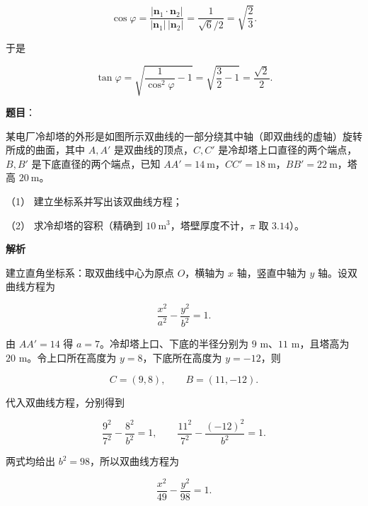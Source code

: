 \begin{answer}
\nopagebreak[4]
\[
\cos\varphi=\frac{|\boldsymbol n_1\cdot\boldsymbol n_2|}
{|\boldsymbol n_1|\,|\boldsymbol n_2|}
=\frac1{\sqrt6/2}=\sqrt{\frac23}.
\]

于是

\nopagebreak[4]
\[
\tan\varphi=\sqrt{\frac1{\cos^2\varphi}-1}
=\sqrt{\frac32-1}=\frac{\sqrt2}{2}.
\]



\end{answer}
\begin{answer}

\textbf{题目}：

某电厂冷却塔的外形是如图所示双曲线的一部分绕其中轴（即双曲线的虚轴）旋转所成的曲面，其中 $A,A'$ 是双曲线的顶点，$C,C'$ 是冷却塔上口直径的两个端点，$B,B'$ 是下底直径的两个端点，已知 $AA'=14\ \mathrm m$，$CC'=18\ \mathrm m$，$BB'=22\ \mathrm m$，塔高 $20\ \mathrm m$。

（1） 建立坐标系并写出该双曲线方程；

（2） 求冷却塔的容积（精确到 $10\ \mathrm m^3$，塔壁厚度不计，$\pi$ 取 $3.14$）。
\nopagebreak[4]
\begin{center}\end{center}
\nopagebreak[4]
\textbf{解析}


建立直角坐标系：取双曲线中心为原点 $O$，横轴为 $x$ 轴，竖直中轴为 $y$ 轴。设双曲线方程为

\nopagebreak[4]
\[
\frac{x^2}{a^2}-\frac{y^2}{b^2}=1.
\]

由 $AA'=14$ 得 $a=7$。冷却塔上口、下底的半径分别为 $9$ m、$11$ m，且塔高为 $20$ m。令上口所在高度为 $y=8$，下底所在高度为 $y=-12$，则

\nopagebreak[4]
\[
C=(9,8),\qquad B=(11,-12).
\]

代入双曲线方程，分别得到

\nopagebreak[4]
\[
\frac{9^2}{7^2}-\frac{8^2}{b^2}=1,\qquad
\frac{11^2}{7^2}-\frac{(-12)^2}{b^2}=1.
\]

两式均给出 $b^2=98$，所以双曲线方程为

\nopagebreak[4]
\[
\frac{x^2}{49}-\frac{y^2}{98}=1.
\]


\end{answer}
